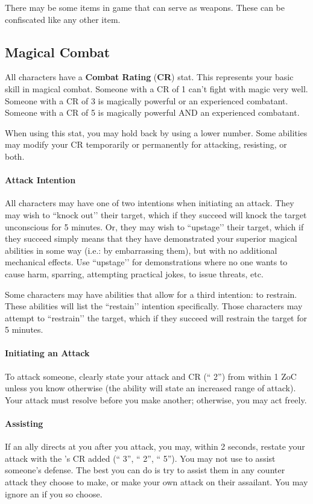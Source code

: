 \documentclass[sheet]{GL2020}
\begin{document}
There may be some items in game that can serve as weapons. These can be confiscated like any other item.

\subsection{Magical Combat}
All characters have a {\bf Combat Rating} ({\bf CR}) stat. This represents your basic skill in magical combat. Someone with a CR of 1 can't fight with magic very well. Someone with a CR of 3 is magically powerful or an experienced combatant. Someone with a CR of 5 is magically powerful AND an experienced combatant. 

When using this stat, you may hold back by using a lower number. Some abilities may modify your CR temporarily or permanently for attacking, resisting, or both.

\paragraph{Attack Intention} All characters may have one of two intentions when initiating an attack. They may wish to ``knock out’’ their target, which if they succeed will knock the target unconscious for 5 minutes. Or, they may wish to ``upstage’’ their target, which if they succeed simply means that they have demonstrated your superior magical abilities in some way (i.e.: by embarrassing them), but with no additional mechanical effects. Use ``upstage’’ for demonstrations where no one wants to cause harm, sparring, attempting practical jokes, to issue threats, etc.

Some characters may have abilities that allow for a third intention: to restrain. These abilities will list the ``restain’’ intention specifically. Those characters may attempt to ``restrain’’ the target, which if they succeed will restrain the target for 5 minutes. 

\paragraph{Initiating an Attack} To attack someone, clearly state your attack and CR (``\aKnockOut{} 2'') from within 1 ZoC unless you know otherwise (the ability will state an increased range of attack). Your attack must resolve before you make another; otherwise, you may act freely. 

\paragraph{Assisting} If an ally directs {\bf \aAssist{}} at you after you attack, you may, within 2 seconds, restate your attack with the \aAssist{}'s CR added (``\aKnockOut{} 3'', ``\aAssist{} 2'', ``\aKnockOut{} 5''). You may not use \aAssist{} to assist someone’s defense. The best you can do is try to assist them in any counter attack they choose to make, or make your own attack on their assailant. You may ignore an \aAssist{} if you so choose.
\end{document}
